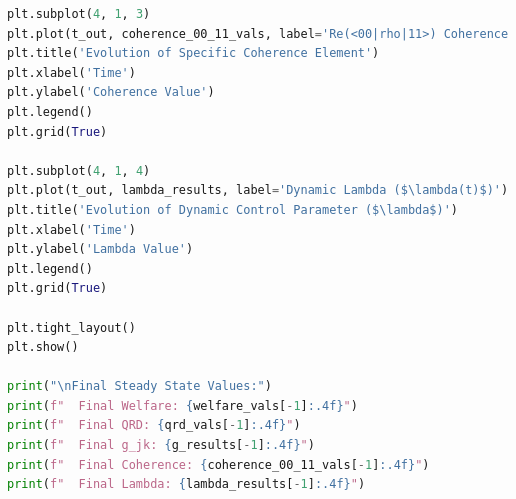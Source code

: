 \documentclass[9pt]{article}
\begin{document}
\begin{lstlisting}[language=Python, basicstyle=\ttfamily\footnotesize, breaklines=true, frame=single, caption={Python Code for Quantum-Classical Coupled with bounded Dynamics}, label={lst:qrd_code}]
plt.subplot(4, 1, 3)
plt.plot(t_out, coherence_00_11_vals, label='Re(<00|rho|11>) Coherence')
plt.title('Evolution of Specific Coherence Element')
plt.xlabel('Time')
plt.ylabel('Coherence Value')
plt.legend()
plt.grid(True)

plt.subplot(4, 1, 4)
plt.plot(t_out, lambda_results, label='Dynamic Lambda ($\lambda(t)$)')
plt.title('Evolution of Dynamic Control Parameter ($\lambda$)')
plt.xlabel('Time')
plt.ylabel('Lambda Value')
plt.legend()
plt.grid(True)

plt.tight_layout()
plt.show()

print("\nFinal Steady State Values:")
print(f"  Final Welfare: {welfare_vals[-1]:.4f}")
print(f"  Final QRD: {qrd_vals[-1]:.4f}")
print(f"  Final g_jk: {g_results[-1]:.4f}")
print(f"  Final Coherence: {coherence_00_11_vals[-1]:.4f}")
print(f"  Final Lambda: {lambda_results[-1]:.4f}")
\end{lstlisting}
\end{document}
